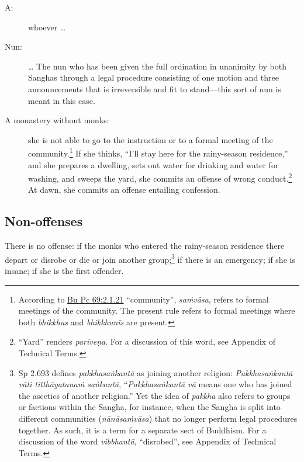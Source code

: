 \documentclass[12pt,openany]{book}%
\begin{document}
\begin{description}%
\item[A: ] whoever … %
\item[Nun: ] … The nun who has been given the full ordination in unanimity by both Sanghas through a legal procedure consisting of one motion and three announcements that is irreversible and fit to stand—this sort of nun is meant in this case. %
\item[A monastery without monks: ] she is not able to go to the instruction or to a formal meeting of the community.\footnote{According to \href{https://suttacentral.net/pli-tv-bu-vb-pc69/en/brahmali\#2.1.21}{Bu Pc 69:2.1.21} “community”, \textit{\textsanskrit{saṁvāsa}}, refers to formal meetings of the community. The present rule refers to formal meetings where both \textit{bhikkhus} and \textit{\textsanskrit{bhikkhunīs}} are present. } If she thinks, “I’ll stay here for the rainy-season residence,” and she prepares a dwelling, sets out water for drinking and water for washing, and sweeps the yard, she commits an offense of wrong conduct.\footnote{“Yard” renders \textit{\textsanskrit{pariveṇa}}. For a discussion of this word, see Appendix of Technical Terms. } At dawn, she commits an offense entailing confession. %
\end{description}

\subsection*{Non-offenses }

There is no offense: if the monks who entered the rainy-season residence there depart or disrobe or die or join another group;\footnote{Sp 2.693 defines \textit{\textsanskrit{pakkhasaṅkantā}} as joining another religion: \textit{\textsanskrit{Pakkhasaṅkantā} \textsanskrit{vāti} \textsanskrit{titthāyatanaṁ} \textsanskrit{saṅkantā}}, “\textit{\textsanskrit{Pakkhasaṅkantā} \textsanskrit{vā}} means one who has joined the ascetics of another religion.” Yet the idea of \textit{pakkha} also refers to groups or factions within the Sangha, for instance, when the Sangha is split into different communities (\textit{\textsanskrit{nānāsaṁvāsa}}) that no longer perform legal procedures together. As such, it is a term for a separate sect of Buddhism. For a discussion of the word \textit{\textsanskrit{vibbhantā}}, “disrobed”, see Appendix of Technical Terms. }  if there is an emergency;  if she is insane;  if she is the first offender. 
\end{document}
